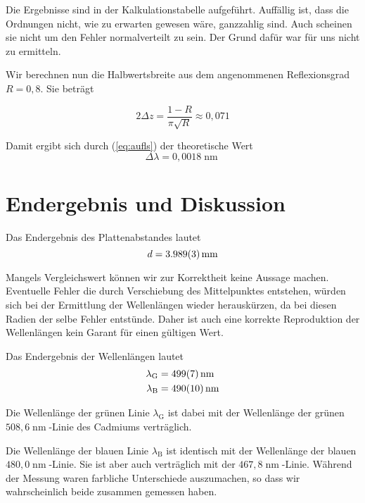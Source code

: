 \documentclass[a4paper,german,12pt,smallheadings]{scrartcl}
\begin{document}
Die Ergebnisse sind in der Kalkulationstabelle aufgeführt. Auffällig ist, dass
die Ordnungen nicht, wie zu erwarten gewesen wäre, ganzzahlig sind. Auch
scheinen sie nicht um den Fehler normalverteilt zu sein. Der Grund dafür war
für uns nicht zu ermitteln.

Wir berechnen nun die Halbwertsbreite aus dem angenommenen Reflexionsgrad $R =
0{,}8$. Sie beträgt

\begin{equation}
  2 \Delta z = \frac{1 - R}{\pi \sqrt{R}} \approx 0{,}071
\end{equation}

Damit ergibt sich durch (\ref{eq:aufls}) der theoretische Wert
\begin{equation}
  \Delta \lambda = 0{,}0018 \operatorname{nm}
\end{equation}


\section{Endergebnis und Diskussion}

Das Endergebnis des Plattenabstandes lautet
\begin{equation}
  d = \num{3.989+-0.003} \operatorname{mm}
\end{equation}

Mangels Vergleichswert können wir zur Korrektheit keine Aussage machen.
Eventuelle Fehler die durch Verschiebung des Mittelpunktes entstehen, würden
sich bei der Ermittlung der Wellenlängen wieder herauskürzen, da bei diesen
Radien der selbe Fehler entstünde. Daher ist auch eine korrekte Reproduktion
der Wellenlängen kein Garant für einen gültigen Wert.

Das Endergebnis der Wellenlängen lautet
\begin{align*}
  \lambda_\text{G} &= \num{499+-7} \operatorname{nm} \\
  \lambda_\text{B} &= \num{490+-10} \operatorname{nm}
\end{align*}

Die Wellenlänge der grünen Linie $\lambda_\text{G}$ ist dabei mit der
Wellenlänge der grünen $508{,}6 \operatorname{nm}$-Linie des Cadmiums
verträglich.

Die Wellenlänge der blauen Linie $\lambda_\text{B}$ ist identisch mit der
Wellenlänge der blauen $480{,}0 \operatorname{nm}$-Linie. Sie ist aber auch
verträglich mit der $467{,}8 \operatorname{nm}$-Linie. Während der Messung
waren farbliche Unterschiede auszumachen, so dass wir
wahrscheinlich beide zusammen gemessen haben.
\end{document}
